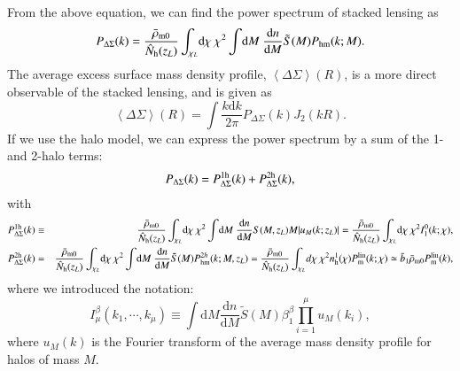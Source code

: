 \documentclass[onecolumn,notitlepage,showpacs,amsmath,amssymb,prd,floatfix]{revtex4-1}
\def\ave#1{\left\langle #1 \right\rangle}
\newcommand{\dr}{\mathrm{d}}
\newcommand{\bh}{\mathrm{h}}
\newcommand{\pml}{P^{\rm lin}_{\rm m}}
\newcommand{\dsigma}{\Delta\Sigma}
\begin{document}
From the above equation, we can find the power spectrum of stacked
lensing as
%
\begin{equation}
 P_{\dsigma}(k)=\frac{\bar{\rho}_{\rm m0}}{\hat{N}_\bh(z_L)}
  \int_{\chi_L}\!\dr\chi~\chi^2
  \int\!\dr M~\frac{\dr n}{\dr M}\tilde{S}(M)P_{\rm hm}(k;M).
\end{equation}
%
The average excess surface mass density profile, $\ave{\dsigma}(R)$,
is a more direct observable of the stacked lensing, and is given as
%
\begin{equation}
 \ave{\dsigma}(R)=\int\!\frac{k\dr k}{2\pi}P_{\dsigma}(k)J_2(kR).
\end{equation}
%
If we use the halo model, we can express the power spectrum by a sum of
the 1- and 2-halo terms:
%
\begin{equation}
 P_{\dsigma}(k)=P^{\rm 1h}_{\dsigma}(k)+P^{\rm 2h}_{\dsigma}(k),
\end{equation}
%
with
%
\begin{eqnarray}
 P^{\rm
  1h}_{\dsigma}(k)&\equiv &
  \frac{\bar{\rho}_{\rm m0}}{\hat{N}_\bh(z_L)}\int_{\chi_L}\!\dr\chi ~\chi^2
  \int\!\dr M~\frac{\dr n}{\dr M}S(M,z_L)M|u_M(k;z_L)|
  =\frac{\bar{\rho}_{\rm m0}}{\hat{N}_\bh(z_L)}\int_{\chi_L}\!\dr\chi ~\chi^2I^0_1(k;\chi),\nonumber \\
 P^{\rm 2h}_{\dsigma}(k)&=&
 \frac{\bar{\rho}_{\rm m0}}{\hat{N}_\bh(z_L)}\int_{\chi_L}\!\dr\chi ~\chi^2
  \int\!\dr M~\frac{\dr n}{\dr M}\tilde{S}(M)
  P_{\rm hm}^{2h}(k;M,z_L)
=\frac{\bar{\rho}_{\rm m0}}{\hat{N}_\bh(z_L)}\int_{\chi_L}\!d\chi
~\chi^2 n_\bh^1(\chi)\pml(k;\chi)
\simeq \bar{b}_1\bar{\rho}_{\rm m0}P^{\rm lin}_{\rm m}(k),\nonumber \\
\end{eqnarray}
%
where we introduced the notation:
%
\begin{equation}
 I^\beta_\mu(k_1,\cdots,k_\mu)\equiv \int\!\dr M\frac{\dr n}{\dr M}\tilde{S}(M)
  \beta_1^\beta\prod_{i=1}^\mu u_M(k_i),
\end{equation}
%
where $u_M(k)$ is the Fourier transform of the average mass density
profile for halos of mass $M$.
\end{document}

